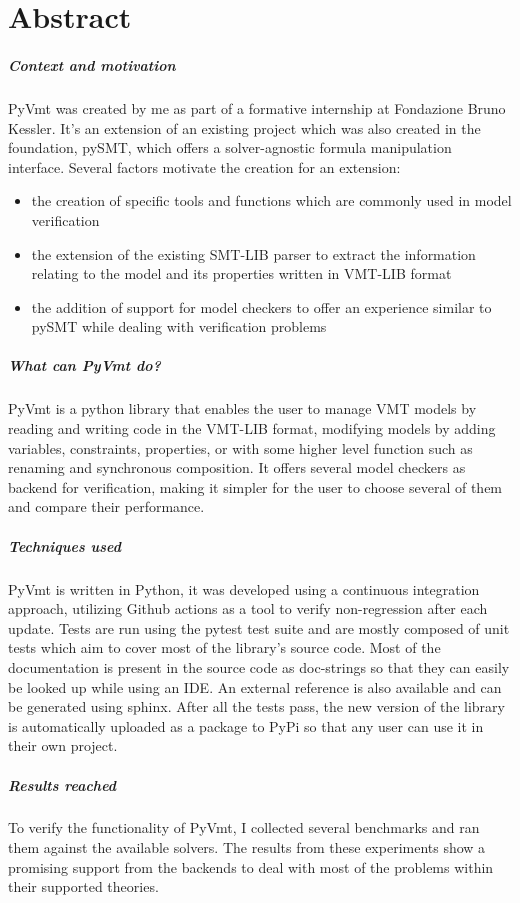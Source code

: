 \chapter*{Abstract}
\label{abstract}


\paragraph*{Context and motivation}
PyVmt was created by me as part of a formative internship at Fondazione Bruno Kessler. It's an extension of an existing project which was also created in the foundation, pySMT, which offers a solver-agnostic formula manipulation interface.
Several factors motivate the creation for an extension:
\begin{itemize}
  \item the creation of specific tools and functions which are commonly used in model verification
  \item the extension of the existing SMT-LIB parser to extract the information relating to the model and its properties written in VMT-LIB format
  \item the addition of support for model checkers to offer an experience similar to pySMT while dealing with verification problems
\end{itemize}

\paragraph*{What can PyVmt do?}
PyVmt is a python library that enables the user to manage VMT models by reading and writing code in the VMT-LIB format, modifying models by adding variables, constraints, properties, or with some higher level function such as renaming and synchronous composition. It offers several model checkers as backend for verification, making it simpler for the user to choose several of them and compare their performance.

\paragraph*{Techniques used}
PyVmt is written in Python, it was developed using a continuous integration approach, utilizing Github actions as a tool to verify non-regression after each update.
Tests are run using the pytest test suite and are mostly composed of unit tests which aim to cover most of the library's source code.
Most of the documentation is present in the source code as doc-strings so that they can easily be looked up while using an IDE. An external reference is also available and can be generated using sphinx.
After all the tests pass, the new version of the library is automatically uploaded as a package to PyPi so that any user can use it in their own project.

\paragraph*{Results reached}
To verify the functionality of PyVmt, I collected several benchmarks and ran them against the available solvers. The results from these experiments show a promising support from the backends to deal with most of the problems within their supported theories.
